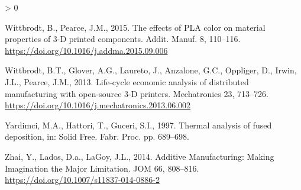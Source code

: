 \documentclass[
]{article}
\newlength{\cslhangindent}
\newenvironment{CSLReferences}[2] %
 {%
  \setlength{\parindent}{0pt}
  \ifodd #1 \everypar{\setlength{\hangindent}{\cslhangindent}}\ignorespaces\fi
  \ifnum #2 > 0
  \setlength{\parskip}{#2\baselineskip}
  \fi
 }%
 {}
\begin{document}
\begin{CSLReferences}{1}{0}
\leavevmode\hypertarget{ref-Wittbrodt2015}{}%
Wittbrodt, B., Pearce, J.M., 2015. {The effects of PLA color on material
properties of 3-D printed components}. Addit. Manuf. 8, 110--116.
\url{https://doi.org/10.1016/j.addma.2015.09.006}

\leavevmode\hypertarget{ref-Wittbrodt2013}{}%
Wittbrodt, B.T., Glover, A.G., Laureto, J., Anzalone, G.C., Oppliger,
D., Irwin, J.L., Pearce, J.M., 2013. {Life-cycle economic analysis of
distributed manufacturing with open-source 3-D printers}. Mechatronics
23, 713--726. \url{https://doi.org/10.1016/j.mechatronics.2013.06.002}

\leavevmode\hypertarget{ref-Yardimci1997}{}%
Yardimci, M.A., Hattori, T., Guceri, S.I., 1997. {Thermal analysis of
fused deposition}, in: Solid Free. Fabr. Proc. pp. 689--698.

\leavevmode\hypertarget{ref-Zhai2014}{}%
Zhai, Y., Lados, D.a., LaGoy, J.L., 2014. {Additive Manufacturing:
Making Imagination the Major Limitation}. JOM 66, 808--816.
\url{https://doi.org/10.1007/s11837-014-0886-2}

\end{CSLReferences}
\end{document}
